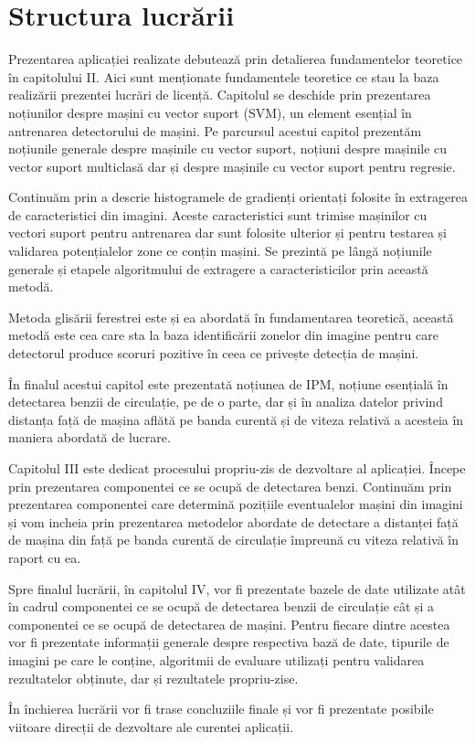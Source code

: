 \section{Structura lucrării}

Prezentarea aplicației realizate debutează prin detalierea fundamentelor teoretice în capitolului II. Aici sunt menționate fundamentele teoretice ce stau la baza realizării prezentei lucrări de licență. 
Capitolul se deschide prin prezentarea noțiunilor despre mașini cu vector suport (SVM), un element esențial în antrenarea detectorului de mașini. Pe parcursul acestui capitol prezentăm noțiunile generale despre mașinile cu vector suport, noțiuni despre mașinile cu vector suport multiclasă dar și despre mașinile cu vector suport pentru regresie.

Continuăm prin a descrie histogramele de gradienți orientați folosite în extragerea de caracteristici din imagini. Aceste caracteristici sunt trimise mașinilor cu vectori suport pentru antrenarea dar sunt folosite ulterior și pentru testarea și validarea potențialelor zone ce conțin mașini. 
Se prezintă pe lângă noțiunile generale și etapele algoritmului de extragere a caracteristicilor prin această metodă. 

Metoda glisării ferestrei este și ea abordată în fundamentarea teoretică, această metodă este cea care sta la baza identificării zonelor din imagine pentru care detectorul produce scoruri pozitive în ceea ce privește detecția de mașini.

În finalul acestui capitol este prezentată noțiunea de IPM, noțiune esențială în detectarea benzii de circulație, pe de o parte, dar și în analiza datelor privind distanța față de mașina aflătă pe banda curentă și de viteza relativă a acesteia în maniera abordată de lucrare.

Capitolul III este dedicat procesului propriu-zis de dezvoltare al aplicației. Începe prin prezentarea componentei ce se ocupă de detectarea benzi. Continuăm prin prezentarea componentei care determină pozițiile eventualelor mașini din imagini și vom incheia prin prezentarea metodelor abordate de detectare a distanței față de mașina din față pe banda curentă de circulație împreună cu viteza relativă în raport cu ea.

Spre finalul lucrării, în capitolul IV, vor fi prezentate bazele de date utilizate atât în cadrul componentei ce se ocupă de detectarea benzii de circulație cât și a componentei ce se ocupă de detectarea de mașini. Pentru fiecare dintre acestea vor fi prezentate informații generale despre respectiva bază de date, tipurile de imagini pe care le conține, algoritmii de evaluare utilizați pentru validarea rezultatelor obținute, dar și rezultatele propriu-zise.

În închierea lucrării vor fi trase concluziile finale și vor fi prezentate posibile viitoare direcții de dezvoltare ale curentei aplicații.